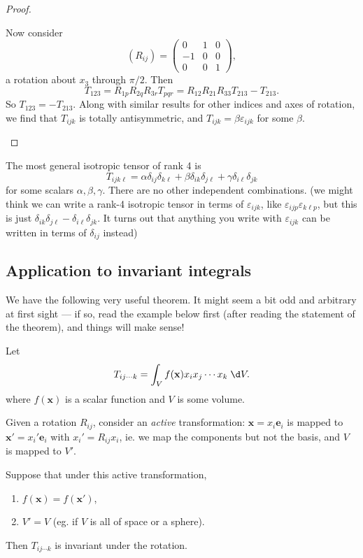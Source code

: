 \documentclass[a4paper]{article}
\begin{document}
\begin{proof}
\begin{enumerate}
      Now consider
      \[
        (R_{ij}) =
        \begin{pmatrix}
          0 & 1 & 0\\
          -1 & 0 & 0\\
          0 & 0 & 1
        \end{pmatrix},
      \]
      a rotation about $x_3$ through $\pi/2$. Then
      \[
        T_{123} = R_{1p}R_{2q}R_{3r}T_{pqr} = R_{12}R_{21}R_{33}T_{213} -T_{213}.
      \]
      So $T_{123} = -T_{213}$. Along with similar results for other indices and axes of rotation, we find that $T_{ijk}$ is totally antisymmetric, and $T_{ijk} = \beta \varepsilon_{ijk}$ for some $\beta$.
  \end{enumerate}
\end{proof}
\begin{eg}
  The most general isotropic tensor of rank 4 is
  \[
    T_{ijk\ell} = \alpha \delta_{ij}\delta_{k\ell} + \beta \delta_{ik}\delta_{j\ell} + \gamma \delta_{i\ell}\delta_{jk}
  \]
  for some scalars $\alpha, \beta, \gamma$. There are no other independent combinations. (we might think we can write a rank-4 isotropic tensor in terms of $\varepsilon_{ijk}$, like $\varepsilon_{ijp}\varepsilon_{k\ell p}$, but this is just $\delta_{ik}\delta_{j\ell} - \delta_{i\ell}\delta_{jk}$. It turns out that anything you write with $\varepsilon_{ijk}$ can be written in terms of $\delta_{ij}$ instead)
\end{eg}

\subsection{Application to invariant integrals}
We have the following very useful theorem. It might seem a bit odd and arbitrary at first sight --- if so, read the example below first (after reading the statement of the theorem), and things will make sense!
\begin{thm}
  Let
  \[
    T_{ij\cdots k} = \int_V f(\mathbf{x}) x_i x_j \cdots x_k\;\d V.
  \]
  where $f(\mathbf{x})$ is a scalar function and $V$ is some volume.

  Given a rotation $R_{ij}$, consider an \emph{active} transformation: $\mathbf{x} = x_i \mathbf{e}_i$ is mapped to $\mathbf{x}' = x_i' \mathbf{e}_i$ with $x_i' = R_{ij} x_i$, ie. we map the components but not the basis, and $V$ is mapped to $V'$.

  Suppose that under this active transformation,
  \begin{enumerate}
    \item $f(\mathbf{x}) = f(\mathbf{x}')$,
    \item $V' = V$ (eg. if $V$ is all of space or a sphere).
  \end{enumerate}
  Then $T_{ij\cdots k}$ is invariant under the rotation.
\end{thm}
\end{document}

